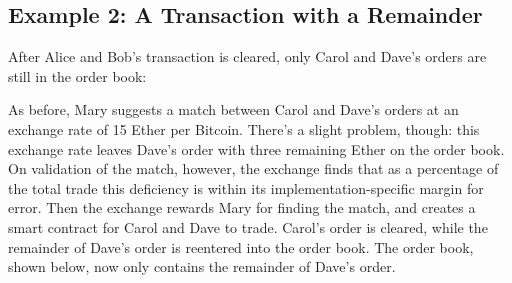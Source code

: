 \documentclass[a4paper]{article}
\begin{document}
	\subsection*{Example 2: A Transaction with a Remainder}
    	After Alice and Bob's transaction is cleared, only
        Carol and Dave's orders are still in the order book:
        \begin{center}
        \end{center}
        As before, Mary suggests a match between Carol and Dave's
        orders at an exchange rate of 15 Ether per Bitcoin. There's
        a slight problem, though: this exchange rate leaves Dave's
        order with three remaining Ether on the order book. On
        validation of the match, however, the exchange finds that as
        a percentage of the total trade this deficiency is
        within its implementation-specific margin for
        error. Then the exchange rewards Mary for finding the match,
        and creates a smart contract for Carol and Dave to
        trade. Carol's order is cleared, while the remainder
        of Dave's order is reentered into the order book. The order
        book, shown below, now only contains the remainder of Dave's
        order.

        \begin{center}
        \end{center}
\end{document}
